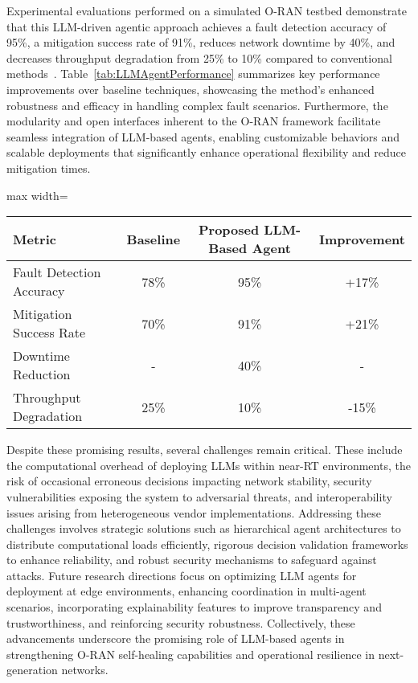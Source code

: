 \documentclass[sigconf]{acmart}
\begin{document}
Experimental evaluations performed on a simulated O-RAN testbed demonstrate that this LLM-driven agentic approach achieves a fault detection accuracy of 95\%, a mitigation success rate of 91\%, reduces network downtime by 40\%, and decreases throughput degradation from 25\% to 10\% compared to conventional methods~\cite{ref55}. Table~\ref{tab:LLMAgentPerformance} summarizes key performance improvements over baseline techniques, showcasing the method’s enhanced robustness and efficacy in handling complex fault scenarios. Furthermore, the modularity and open interfaces inherent to the O-RAN framework facilitate seamless integration of LLM-based agents, enabling customizable behaviors and scalable deployments that significantly enhance operational flexibility and reduce mitigation times.

\begin{table*}[htbp]
\centering
\caption{Performance Comparison of LLM-Based Agentic AI Approach vs.\ Baseline in O-RAN Fault Management}
\label{tab:LLMAgentPerformance}
\begin{adjustbox}{max width=\textwidth}
\begin{tabular}{@{}lccc@{}}
\toprule
Metric & Baseline & Proposed LLM-Based Agent & Improvement \\
\midrule
Fault Detection Accuracy & 78\% & 95\% & +17\% \\
Mitigation Success Rate & 70\% & 91\% & +21\% \\
Downtime Reduction & - & 40\% & - \\
Throughput Degradation & 25\% & 10\% & -15\% \\
\bottomrule
\end{tabular}
\end{adjustbox}
\end{table*}

Despite these promising results, several challenges remain critical. These include the computational overhead of deploying LLMs within near-RT environments, the risk of occasional erroneous decisions impacting network stability, security vulnerabilities exposing the system to adversarial threats, and interoperability issues arising from heterogeneous vendor implementations. Addressing these challenges involves strategic solutions such as hierarchical agent architectures to distribute computational loads efficiently, rigorous decision validation frameworks to enhance reliability, and robust security mechanisms to safeguard against attacks. Future research directions focus on optimizing LLM agents for deployment at edge environments, enhancing coordination in multi-agent scenarios, incorporating explainability features to improve transparency and trustworthiness, and reinforcing security robustness. Collectively, these advancements underscore the promising role of LLM-based agents in strengthening O-RAN self-healing capabilities and operational resilience in next-generation networks.
\end{document}
